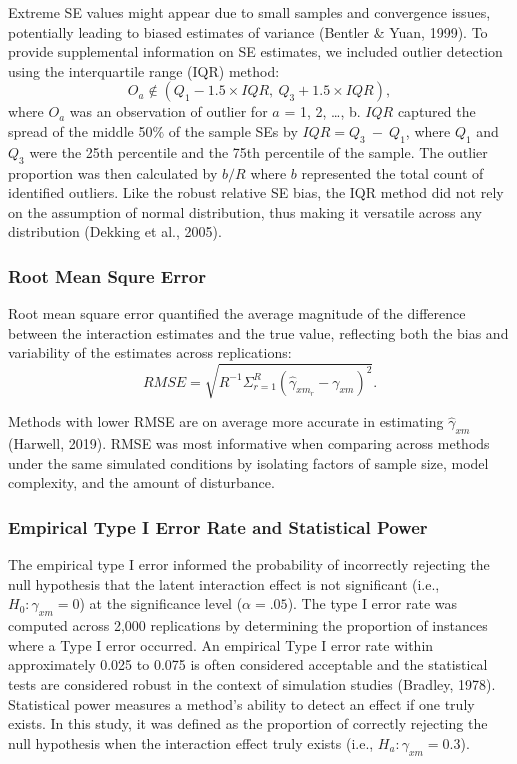 \documentclass[
  man]{apa6}
\begin{document}
Extreme SE values might appear due to small samples and convergence issues, potentially leading to biased estimates of variance (Bentler \& Yuan, 1999). To provide supplemental information on SE estimates, we included outlier detection using the interquartile range (IQR) method:
\begin{equation}
O_{a} \not\in (Q_{1} - 1.5 \times IQR, \ Q_{3} + 1.5 \times IQR),
\end{equation}
where \(O_{a}\) was an observation of outlier for \(a\) = 1, 2, \ldots, b. \(IQR\) captured the spread of the middle 50\(\%\) of the sample SEs by \(IQR = Q_{3} \ - \ Q_{1}\), where \(Q_{1}\) and \(Q_{3}\) were the 25th percentile and the 75th percentile of the sample. The outlier proportion was then calculated by \(b/R\) where \(b\) represented the total count of identified outliers. Like the robust relative SE bias, the IQR method did not rely on the assumption of normal distribution, thus making it versatile across any distribution (Dekking et al., 2005).

\subsubsection{Root Mean Squre Error}\label{root-mean-squre-error}

Root mean square error quantified the average magnitude of the difference between the interaction estimates and the true value, reflecting both the bias and variability of the estimates across replications:
\begin{equation}
RMSE = \sqrt{R^{-1}\Sigma^{R}_{r = 1}(\hat{\gamma}_{xm_{r}} - \gamma_{xm})^2}.
\end{equation}

Methods with lower RMSE are on average more accurate in estimating \(\hat{\gamma}_{xm}\) (Harwell, 2019). RMSE was most informative when comparing across methods under the same simulated conditions by isolating factors of sample size, model complexity, and the amount of disturbance.

\subsubsection{Empirical Type I Error Rate and Statistical Power}\label{empirical-type-i-error-rate-and-statistical-power}

The empirical type I error informed the probability of incorrectly rejecting the null hypothesis that the latent interaction effect is not significant (i.e., \(H_{0}: \gamma_{xm} = 0\)) at the significance level (\(\alpha = .05\)). The type I error rate was computed across 2,000 replications by determining the proportion of instances where a Type I error occurred. An empirical Type I error rate within approximately 0.025 to 0.075 is often considered acceptable and the statistical tests are considered robust in the context of simulation studies (Bradley, 1978). Statistical power measures a method's ability to detect an effect if one truly exists. In this study, it was defined as the proportion of correctly rejecting the null hypothesis when the interaction effect truly exists (i.e., \(H_{a}: \gamma_{xm} = 0.3\)).
\end{document}
